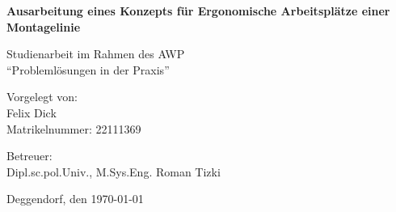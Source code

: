 \documentclass[12pt, a4paper]{article}
\begin{document}

\begin{titlepage}
    \centering
    
    
    \vspace{2cm}
    
    {\Huge\bfseries Ausarbeitung eines Konzepts für Ergonomische Arbeitsplätze einer Montagelinie\par}
    
    \vspace{1cm}
    
    {\Large Studienarbeit im Rahmen des AWP \\
    \enquote{Problemlösungen in der Praxis}\par}
    
    \vspace{2cm}
    
    {\large
    Vorgelegt von: \\
    \vspace{0.2cm}
    Felix Dick \\ 
    Matrikelnummer: 22111369 \\
    \vspace{1.5cm}
    
    Betreuer: \\
    Dipl.sc.pol.Univ., M.Sys.Eng. Roman Tizki \par} %
    
    \vfill %
    
    {\large Deggendorf, den \today\par}

\end{titlepage}



\thispagestyle{empty}

\newpage

\tableofcontents
\newpage








\newpage
\printbibliography[title={References}]
\end{document}
